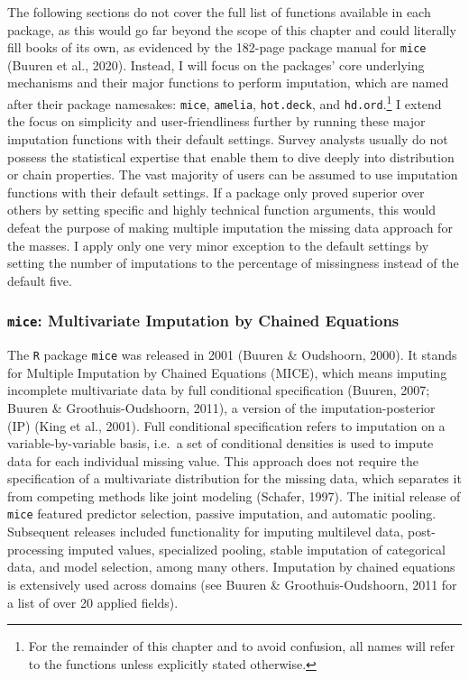 \documentclass[12pt,econ]{sources/authesis}
\begin{document}
The following sections do not cover the full list of functions available in each package, as this would go far beyond the scope of this chapter and could literally fill books of its own, as evidenced by the 182-page package manual for \texttt{mice} (Buuren et al., 2020). Instead, I will focus on the packages' core underlying mechanisms and their major functions to perform imputation, which are named after their package namesakes: \texttt{mice}, \texttt{amelia}, \texttt{hot.deck}, and \texttt{hd.ord}.\footnote{For the remainder of this chapter and to avoid confusion, all names will refer to the functions unless explicitly stated otherwise.} I extend the focus on simplicity and user-friendliness further by running these major imputation functions with their default settings. Survey analysts usually do not possess the statistical expertise that enable them to dive deeply into distribution or chain properties. The vast majority of users can be assumed to use imputation functions with their default settings. If a package only proved superior over others by setting specific and highly technical function arguments, this would defeat the purpose of making multiple imputation the missing data approach for the masses. I apply only one very minor exception to the default settings by setting the number of imputations to the percentage of missingness instead of the default five.

\hypertarget{ordmiss-theory-multimpute-mice}{%
\subsubsection{\texorpdfstring{\texttt{mice}: Multivariate Imputation by Chained Equations}{mice: Multivariate Imputation by Chained Equations}}\label{ordmiss-theory-multimpute-mice}}

The \texttt{R} package \texttt{mice} was released in 2001 (Buuren \& Oudshoorn, 2000). It stands for Multiple Imputation by Chained Equations (MICE), which means imputing incomplete multivariate data by full conditional specification (Buuren, 2007; Buuren \& Groothuis-Oudshoorn, 2011), a version of the imputation-posterior (IP) (King et al., 2001). Full conditional specification refers to imputation on a variable-by-variable basis, i.e.~a set of conditional densities is used to impute data for each individual missing value. This approach does not require the specification of a multivariate distribution for the missing data, which separates it from competing methods like joint modeling (Schafer, 1997). The initial release of \texttt{mice} featured predictor selection, passive imputation, and automatic pooling. Subsequent releases included functionality for imputing multilevel data, post-processing imputed values, specialized pooling, stable imputation of categorical data, and model selection, among many others. Imputation by chained equations is extensively used across domains (see Buuren \& Groothuis-Oudshoorn, 2011 for a list of over 20 applied fields).
\end{document}

